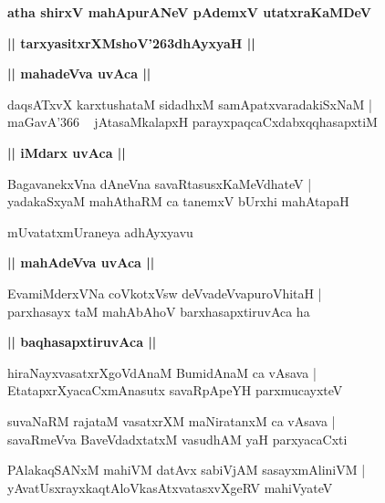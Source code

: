 \documentclass[twoside,12pt,openright]{book}
\def\S{\char'263}
\newcounter{shloka}[chapter]
\def\uvaca#1{\centerline{{\large\textbf{#1}}}}
\begin{document}
\begin{center}
{\LARGE\bfseries atha shirxV mahApurANeV pAdemxV utatxraKaMDeV}
\end{center}

\begin{center}
{\LARGE\bfseries || tarxyasitxrXMshoV\S dhAyxyaH ||}
\end{center}

\uvaca{|| mahadeVva uvAca ||}

\begin{shloka}%
daqsATxvX karxtushataM sidadhxM samApatxvaradakiSxNaM |\\
maGavA\char'366 ~ jAtasaMkalapxH parayxpaqcaCxdabxqqhasapxtiM
\end{shloka}

\uvaca{|| iMdarx uvAca ||}

\begin{shloka}%
BagavanekxVna dAneVna savaRtasusxKaMeVdhateV |\\
yadakaSxyaM mahAthaRM ca tanemxV bUrxhi mahAtapaH
\end{shloka}

\begin{center}
mUvatatxmUraneya adhAyxyavu
\end{center}

\uvaca{|| mahAdeVva uvAca ||}

\begin{shloka}%
EvamiMderxVNa coVkotxVsw deVvadeVvapuroVhitaH |\\
parxhasayx taM mahAbAhoV barxhasapxtiruvAca ha 
\end{shloka}

\uvaca{|| baqhasapxtiruvAca ||}

\begin{shloka}%
hiraNayxvasatxrXgoVdAnaM BumidAnaM ca vAsava |\\
EtatapxrXyacaCxmAnasutx savaRpApeYH parxmucayxteV 
\end{shloka}

\begin{shloka}%
suvaNaRM rajataM vasatxrXM maNiratanxM ca vAsava |\\
savaRmeVva BaveVdadxtatxM vasudhAM yaH parxyacaCxti 
\end{shloka}

\begin{shloka}%
PAlakaqSANxM mahiVM datAvx sabiVjAM sasayxmAliniVM |\\
yAvatUsxrayxkaqtAloVkasAtxvatasxvXgeRV mahiVyateV
\end{shloka}
\end{document}
